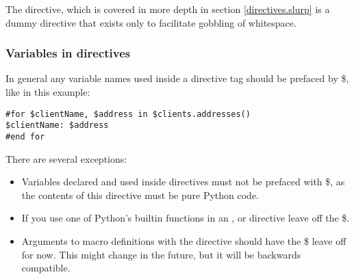 The  directive, which is covered in more depth in section
\ref{directives.slurp} is a dummy directive that exists only to facilitate
gobbling of whitespace.

\subsubsection{Variables in directives}
\label{TDL.directives.variables}

In general any variable names used inside a directive tag should be prefaced by
\$, like in this example:

\begin{verbatim}
#for $clientName, $address in $clients.addresses()
$clientName: $address
#end for
\end{verbatim}

There are several exceptions: 

\begin{itemize}
\item Variables declared and used inside  directives must not be
     prefaced with \$, as the contents of this directive must be pure Python
     code.

\item If you use one of Python's builtin functions in an ,
      or  directive leave off the \$.

\item Arguments to macro definitions with the  directive should
     have the \$ leave off for now.  This might change in the future, but it
     will be backwards compatible.

\end{itemize}